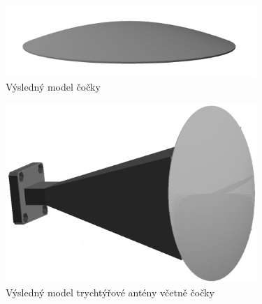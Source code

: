\begin{figure}[h]
\begin{center}
\includegraphics[width=9.5cm]{pics/LensModel}
\caption{Výsledný model čočky}
\label{fig:LensFinal}
\end{center}
\end{figure}

\begin{figure}[h]
\begin{center}
\includegraphics[width=9.5cm]{pics/HornFinalLens}
\caption{Výsledný model trychtýřové antény včetně čočky}
\label{fig:HornFinalLens}
\end{center}
\end{figure}

